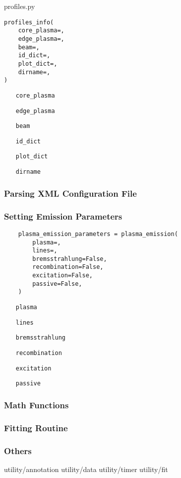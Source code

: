 \documentclass[../../main.tex]{subfiles}
\begin{document}
profiles.py

\begin{verbatim}
profiles_info(
    core_plasma=,
    edge_plasma=,
    beam=,
    id_dict=,
    plot_dict=,
    dirname=,
)
\end{verbatim}

\begin{itemize}[align=left]
    \item[\texttt{core\_plasma}]
    \item[\texttt{edge\_plasma}]
    \item[\texttt{beam}]
    \item[\texttt{id\_dict}]
    \item[\texttt{plot\_dict}]
    \item[\texttt{dirname}]
\end{itemize}

\subsubsection{Parsing XML Configuration File}%
\label{sec:xml}


\subsubsection{Setting Emission Parameters}%
\label{sec:emission}

\begin{verbatim}
    plasma_emission_parameters = plasma_emission(
        plasma=,
        lines=,
        bremsstrahlung=False,
        recombination=False,
        excitation=False,
        passive=False,
    )
\end{verbatim}

\begin{itemize}[align=left]
    \item[\texttt{plasma}]
    \item[\texttt{lines}]
    \item[\texttt{bremsstrahlung}]
    \item[\texttt{recombination}]
    \item[\texttt{excitation}]
    \item[\texttt{passive}]
\end{itemize}

\subsubsection{Math Functions}%
\label{sec:math}

\subsubsection{Fitting Routine}%
\label{sec:fitting}

\subsubsection{Others}%
\label{sec:other}

utility/annotation
utility/data
utility/timer
utility/fit
\end{document}
